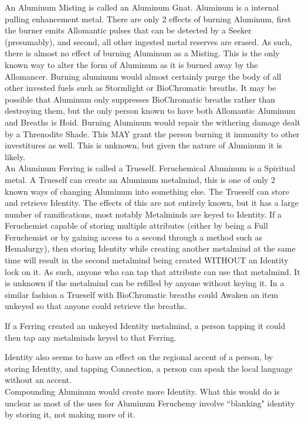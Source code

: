 \documentclass[conference]{IEEEtran}
\begin{document}
An Aluminum Misting is called an Aluminum Gnat.  Aluminum is a internal pulling enhancement metal.  There are only 2 effects of burning Aluminum, first the burner emits Allomantic pulses that can be detected by a Seeker (presumably), and second, all other ingested metal reserves are erased.  As such, there is almost no effect of burning Aluminum as a Misting.  This is the only known way to alter the form of Aluminum as it is burned away by the Allomancer.  Burning aluminum would almost certainly purge the body of all other invested fuels such as Stormlight or BioChromatic breaths.  It may be possible that Aluminum only suppresses BioChromatic breaths rather than destroying them, but the only person known to have both Allomantic Aluminum and Breaths is Hoid. Burning Aluminum would repair the withering damage dealt by a Threnodite Shade. This MAY grant the person burning it immunity to other investitures as well.  This is unknown, but given the nature of Aluminum it is likely.\\

An Aluminum Ferring is called a Trueself.  Feruchemical Aluminum is a Spiritual metal.  A Trueself can create an Aluminum metalmind, this is one of only 2 known ways of changing Aluminum into something else.  The Trueself can store and retrieve Identity.  The effects of this are not entirely known, but it has a large number of ramifications, most notably  Metalminds are keyed to Identity.  If a Feruchemist capable of storing multiple attributes (either by being a Full Feruchemist or by gaining access to a second through a method such as Hemalurgy), then storing Identity while creating another metalmind at the same time will result in the second metalmind being created WITHOUT an Identity lock on it.  As such, anyone who can tap that attribute can use that metalmind.  It is unknown if the metalmind can be refilled by anyone without keying it.  In a similar fashion a Trueself with BioChromatic breaths could Awaken an item unkeyed so that anyone could retrieve the breaths.

If a Ferring created an unkeyed Identity metalmind, a person tapping it could then tap any metalminds keyed to that Ferring.

Identity also seems to have an effect on the regional accent of a person, by storing Identity, and tapping Connection, a person can speak the local language without an accent.\\

Compounding Aluminum would create more Identity.  What this would do is unclear as most of the uses for Aluminum Feruchemy involve ``blanking" identity by storing it, not making more of it.  \\
\end{document}
